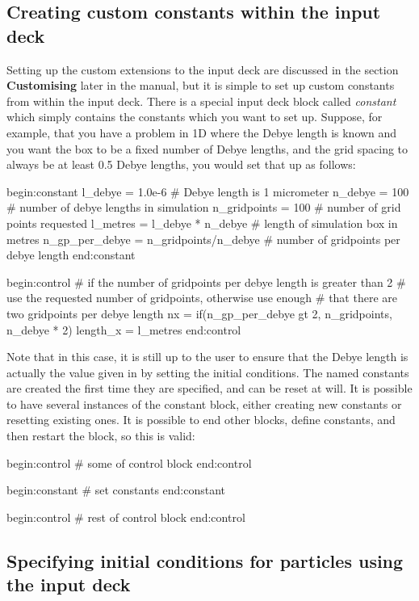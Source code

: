 \subsection{Creating custom constants within the input deck}
Setting up the custom extensions to the input deck are discussed in the
section {\bf Customising {\EPOCH}} later in the manual, but it is simple to set
up custom constants from within the input deck. There is a special input deck
block called {\it constant} which simply contains the constants which you want
to set up. Suppose, for example, that you have a problem in 1D where the Debye
length is known and you want the box to be a fixed number of Debye lengths,
and the grid spacing to always be at least 0.5 Debye lengths, you would set
that up as follows:
\begin{boxverbatim}
begin:constant
  l_debye = 1.0e-6 # Debye length is 1 micrometer
  n_debye = 100 # number of debye lengths in simulation
  n_gridpoints = 100 # number of grid points requested
  l_metres = l_debye * n_debye # length of simulation box in metres
  n_gp_per_debye = n_gridpoints/n_debye # number of gridpoints per debye length
end:constant

begin:control
  # if the number of gridpoints per debye length is greater than 2
  # use the requested number of gridpoints, otherwise use enough
  # that there are two gridpoints per debye length
  nx = if(n_gp_per_debye gt 2, n_gridpoints, n_debye * 2)
  length_x = l_metres
end:control
\end{boxverbatim}

Note that in this case, it is still up to the user to ensure that the Debye
length is actually the value given in  by setting the
initial conditions. The named constants are created the first time they are
specified, and can be reset at will. It is possible to have several instances
of the constant block, either creating new constants or resetting existing
ones. It is possible to end other blocks, define constants, and then
restart the block, so this is valid:
\begin{boxverbatim}
begin:control
   # some of control block
end:control

begin:constant
   # set constants
end:constant

begin:control
   # rest of control block
end:control
\end{boxverbatim}

\subsection{Specifying initial conditions for particles using the input deck}

